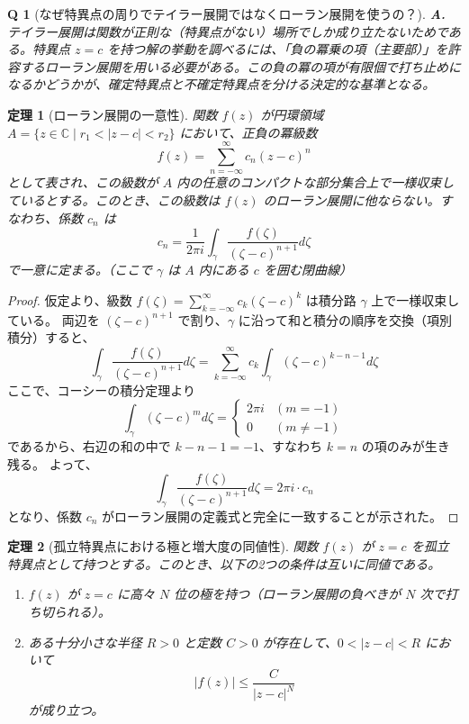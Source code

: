 \documentclass[paper=a4, fontsize=11pt]{jlreq} %
\theoremstyle{break}
\newtheorem{theorem}{定理}[section]
\theoremstyle{qa}
\newtheorem*{Q}{Q}
\theoremstyle{remark} %
\begin{document}
\begin{Q}[なぜ特異点の周りでテイラー展開ではなくローラン展開を使うの？]
\textbf{A.} テイラー展開は関数が正則な（特異点がない）場所でしか成り立たないためである。特異点 $z=c$ を持つ解の挙動を調べるには、「負の冪乗の項（主要部）」を許容するローラン展開を用いる必要がある。この負の冪の項が有限個で打ち止めになるかどうかが、確定特異点と不確定特異点を分ける決定的な基準となる。
\end{Q}
\begin{theorem}[ローラン展開の一意性]\label{thm:laurent_uniqueness}
    関数 $f(z)$ が円環領域 $A = \{z \in \mathbb{C} \mid r_1 < |z-c| < r_2\}$ において、正負の冪級数
    \[
    f(z) = \sum_{n=-\infty}^{\infty} c_n (z-c)^n
    \]
    として表され、この級数が $A$ 内の任意のコンパクトな部分集合上で一様収束しているとする。このとき、この級数は $f(z)$ のローラン展開に他ならない。すなわち、係数 $c_n$ は
    \[
    c_n = \frac{1}{2\pi i} \int_{\gamma} \frac{f(\zeta)}{(\zeta-c)^{n+1}} d\zeta
    \]
    で一意に定まる。（ここで $\gamma$ は $A$ 内にある $c$ を囲む閉曲線）
\end{theorem}

\begin{proof}%
    仮定より、級数 $f(\zeta) = \sum_{k=-\infty}^{\infty} c_k (\zeta-c)^k$ は積分路 $\gamma$ 上で一様収束している。
    両辺を $(\zeta-c)^{n+1}$ で割り、$\gamma$ に沿って和と積分の順序を交換（項別積分）すると、
    \[
    \int_{\gamma} \frac{f(\zeta)}{(\zeta-c)^{n+1}} d\zeta = \sum_{k=-\infty}^{\infty} c_k \int_{\gamma} (\zeta-c)^{k-n-1} d\zeta
    \]
    ここで、コーシーの積分定理より
    \[
    \int_{\gamma} (\zeta-c)^{m} d\zeta =
    \begin{cases}
        2\pi i & (m = -1) \\
        0 & (m \neq -1)
    \end{cases}
    \]
    であるから、右辺の和の中で $k-n-1 = -1$、すなわち $k=n$ の項のみが生き残る。
    よって、
    \[
    \int_{\gamma} \frac{f(\zeta)}{(\zeta-c)^{n+1}} d\zeta = 2\pi i \cdot c_n
    \]
    となり、係数 $c_n$ がローラン展開の定義式と完全に一致することが示された。
\end{proof}
\begin{theorem}[孤立特異点における極と増大度の同値性]\label{thm:growth_and_pole}
    関数 $f(z)$ が $z=c$ を孤立特異点として持つとする。このとき、以下の2つの条件は互いに同値である。
    \begin{enumerate}
        \item[(P)] $f(z)$ が $z=c$ に高々 $N$ 位の極を持つ（ローラン展開の負べきが $N$ 次で打ち切られる）。
        \item[(Q)] ある十分小さな半径 $R > 0$ と定数 $C > 0$ が存在して、$0 < |z-c| < R$ において
        \[
        |f(z)| \le \frac{C}{|z-c|^N}
        \]
        が成り立つ。
    \end{enumerate}
\end{theorem}
\end{document}
